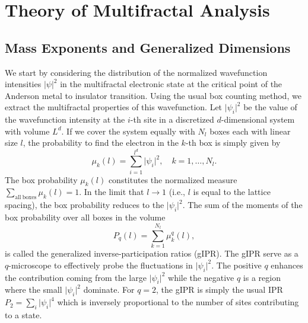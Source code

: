 %
%
%
%

\chapter{Theory of Multifractal Analysis}

\section{Mass Exponents and Generalized Dimensions}
\label{sec-gIPR}

We start by considering the distribution of the normalized wavefunction
intensities $\vert\psi\vert^2$ in the multifractal electronic state at the
critical point of the Anderson metal to insulator transition.  Using the usual
box counting method, we extract the multifractal properties of this
wavefunction.   Let  $\vert\psi_i\vert^2$ be the value of the wavefunction
intensity at the $i$-th site in a discretized $d$-dimensional system with volume
$L^d$.
If we cover the system equally with $N_l$ boxes each with linear size $l$, the
probability to find the electron in the $k$-th box is simply given by
%
\begin{equation}
	\mu_k(l)=\sum_{i=1}^{l^d} \vert\psi_i\vert^2,\quad k=1,\ldots,N_l.
	\label{eq-mudef}
\end{equation}
%
The box probability $\mu_k(l)$ constitutes the normalized measure
$\sum_{\mathrm{all~boxes}} \mu_k(l)=1$.
In the limit that $l\rightarrow 1$ (i.e., $l$ is equal to the lattice spacing),
the box probability reduces to the $\vert\psi_i\vert^2$.
The sum of the moments of the box probability over all boxes in the volume
%
\begin{equation}
 	P_q (l)=\sum_{k=1}^{N_l}\mu_k^q(l),
	\label{eq-IPRdef}
\end{equation}
%
is called the generalized inverse-participation ratios (gIPR).  The gIPR serve
as a $q$-microscope to effectively probe the fluctuations in
$\vert\psi_i\vert^2$.  The positive $q$ enhances the contribution coming from
the large $\vert\psi_i\vert^2$ while the negative $q$ is a region where the
small $\vert\psi_i\vert^2$ dominate.  For $q=2$, the gIPR is simply
the usual IPR $P_2=\sum_i \vert\psi_i\vert^4$ which is inversely proportional to the
number of sites contributing to a state.


